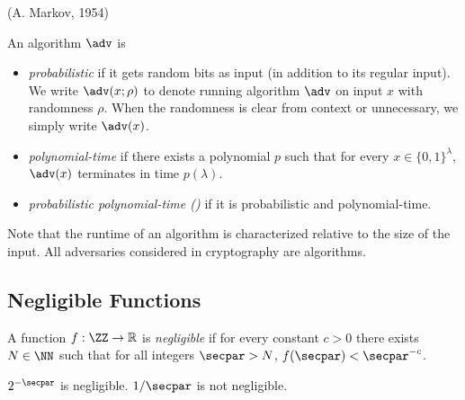  (A. Markov, 1954)

\begin{definition}
An algorithm $\adv$ is
\begin{itemize}
\item \emph{probabilistic} if it gets random bits as input (in addition to its regular input).
We write $\adv(x; \rho)$ to denote running algorithm $\adv$ on input $x$ with randomness $\rho$.
When the randomness is clear from context or unnecessary, we simply write $\adv(x)$.
\item \emph{polynomial-time} if there exists a polynomial $p$ such that for every $x \in \{0,1\}^\lambda$, $\adv(x)$ terminates in time $p(\lambda)$.
\item \emph{probabilistic polynomial-time (\ppt)} if it is probabilistic and polynomial-time.
\end{itemize}
\end{definition}

Note that the runtime of an algorithm is characterized relative to the size of the input.
All adversaries considered in cryptography are algorithms.

\subsection{Negligible Functions}



\begin{definition}
A function $f: \ZZ \rightarrow \mathbb{R}$ is \emph{negligible} if for every constant $c > 0$ there exists $N \in \NN$ such that for all integers $\secpar > N$, $f(\secpar) < \secpar^{-c}$.
\end{definition}

\begin{example}
  $2^{-\secpar}$ is negligible. $1/\secpar$ is not negligible.
\end{example}

